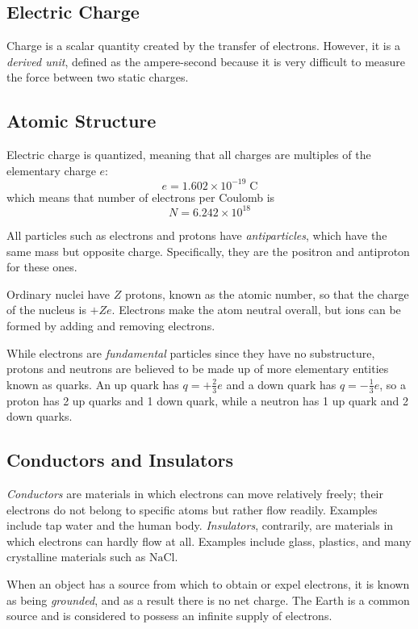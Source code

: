 \documentclass[../PhysicsFormulae.tex]{subfiles}
\begin{document}
\subsection{Electric Charge}
Charge is a scalar quantity created by the transfer of electrons. However, it is a \textit{derived unit}, defined as the ampere-second because it is very difficult to measure the force between two static charges. 

\subsection{Atomic Structure}
Electric charge is quantized, meaning that all charges are multiples of the elementary charge $e$: 
\[ e = 1.602 \times 10^{-19} \; \mathrm{C} \] 
which means that number of electrons per Coulomb is  
\[ N = 6.242 \times 10^{18} \] 

All particles such as electrons and protons have \textit{antiparticles}, which have the same mass but opposite charge. Specifically, they are the positron and antiproton for these ones. \bigskip 

Ordinary nuclei have $Z$ protons, known as the atomic number, so that the charge of the nucleus is $+Ze$. Electrons make the atom neutral overall, but ions can be formed by adding and removing electrons. \bigskip 

While electrons are \textit{fundamental} particles since they have no substructure, protons and neutrons are believed to be made up of more elementary entities known as quarks. An up quark has $q = +\frac{2}{3}e$ and a down quark has $q = -\frac{1}{3}e$, so a proton has 2 up quarks and 1 down quark, while a neutron has 1 up quark and 2 down quarks. 

\subsection{Conductors and Insulators}
\textit{Conductors} are materials in which electrons can move relatively freely; their electrons do not belong to specific atoms but rather flow readily. Examples include tap water and the human body. \textit{Insulators}, contrarily, are materials in which electrons can hardly flow at all. Examples include glass, plastics, and many crystalline materials such as $\mathrm{NaCl}$. \bigskip 

When an object has a source from which to obtain or expel electrons, it is known as being \textit{grounded}, and as a result there is no net charge. The Earth is a common source and is considered to possess an infinite supply of electrons. \bigskip 
\end{document}
